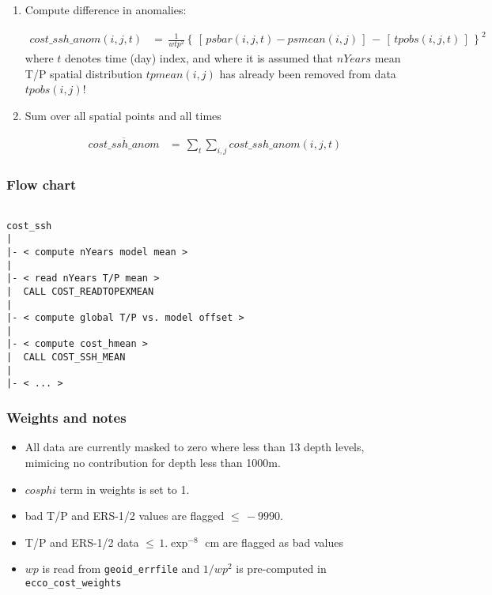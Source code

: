 \begin{enumerate}
%
\item
Compute difference in anomalies:

\begin{equation}
\begin{aligned}
cost\_ssh\_anom(i,j,t) & = \, \frac{1}{wtp^2} \left\{ \, 
\left[ \, psbar(i,j,t) - psmean(i,j) \, \right] \, - \, 
\left[ \, tpobs(i,j,t) \, \right] \,
\right\}^2
\end{aligned}
\end{equation}
%
where $t$ denotes time (day) index, and
where it is assumed that $ nYears$ mean T/P spatial distribution
$tpmean(i,j)$ has already been removed from data $tpobs(i,j)$!

\item
Sum over all spatial points and all times

\begin{equation}
\begin{aligned}
\overline{cost\_ssh\_anom} & = \, \sum_{t} \sum_{i,j}
cost\_ssh\_anom(i,j,t)
\end{aligned}
\end{equation}

\end{enumerate}

\subsubsection{Flow chart}

\begin{verbatim}

cost_ssh
|
|- < compute nYears model mean >
|
|- < read nYears T/P mean >
|  CALL COST_READTOPEXMEAN
|
|- < compute global T/P vs. model offset >
|
|- < compute cost_hmean >
|  CALL COST_SSH_MEAN
|
|- < ... >

\end{verbatim}

\subsubsection{Weights and notes}

\begin{itemize}
%
\item
All data are currently masked to zero where less than 13 depth levels,
mimicing no contribution for depth less than 1000m.
%
\item
$cosphi$ term in weights is set to 1.
%
\item
bad T/P and ERS-1/2 values are flagged $ \le \, -9990. $
%
\item
T/P and ERS-1/2 data $ \le \, 1.\exp^{-8}$ cm are flagged as bad values
%
\item
$wp$ is read from {\tt geoid\_errfile}
and $1/wp^2$ is pre-computed in {\tt ecco\_cost\_weights}
%
\end{itemize}

